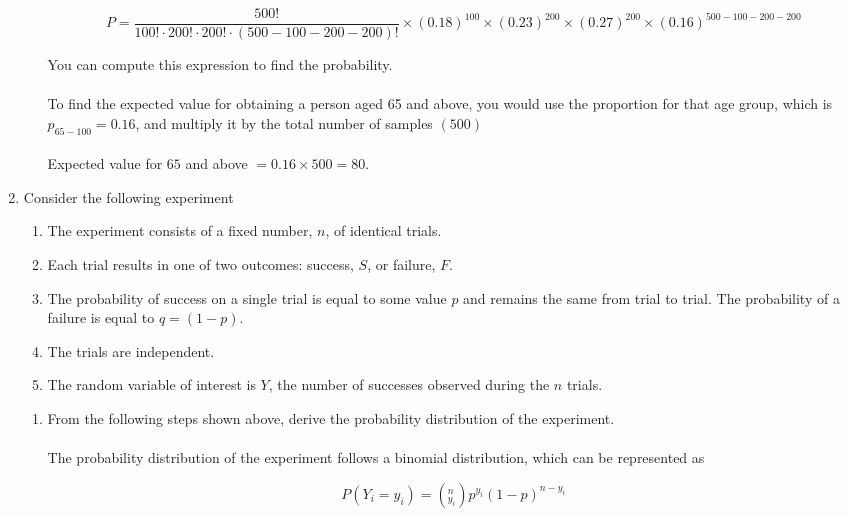 \documentclass{article}
\begin{document}
\begin{enumerate}
\begin{enumerate}[label=1.\arabic*]
		            \begin{equation}
			            P = \frac{500!}{100! \cdot 200! \cdot 200! \cdot (500 - 100 - 200 - 200)!} \times (0.18)^{100} \times (0.23)^{200} \times (0.27)^{200} \times (0.16)^{500 - 100 - 200 - 200}
		            \end{equation}

		            You can compute this expression to find the probability.
		            \\~\\
		            To find the expected value for obtaining a person aged 65 and above, you would use the proportion for that age group, which is $p_{65-100} = 0.16$, and multiply it by the total number of samples $(500)$
		            \\~\\
		            Expected value for $65$ and above $ = 0.16 \times 500 = 80$.
	      \end{enumerate}
	\item Consider the following experiment
	      \setcounter{equation}{0}
	      \begin{enumerate}
		      \item The experiment consists of a fixed number, $n$, of identical trials.
		      \item Each trial results in one of two outcomes: success, $S$, or failure, $F$.
		      \item The probability of success on a single trial is equal to some value $p$ and remains the same from trial to trial. The probability of a failure is equal to $q = (1 - p)$.
		      \item The trials are independent.
		      \item The random variable of interest is $Y$, the number of successes observed during the $n$ trials.
	      \end{enumerate}

	      \begin{enumerate}[label=2.\arabic*]
		      \item From the following steps shown above, derive the probability distribution of the experiment.
		            \\~\\
		            The probability distribution of the experiment follows a binomial distribution, which can be represented as

		            \begin{equation}
			            P(Y_i = y_i) = (_{y_i}^{n}) p^{y_i} (1 - p)^{n - y_i}
		            \end{equation}


\end{enumerate}
\end{enumerate}
\end{document}
